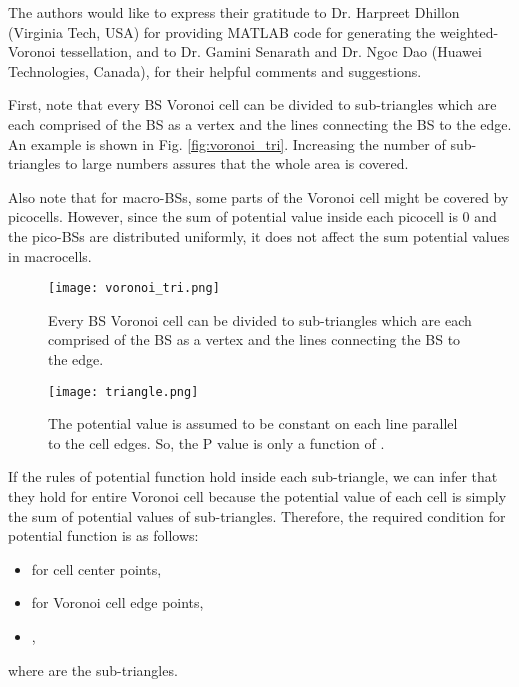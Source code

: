 \documentclass[journal]{IEEEtran}
\begin{document}
The authors would like to express their gratitude to Dr. Harpreet Dhillon (Virginia Tech, USA) for providing MATLAB code for generating the weighted-Voronoi tessellation, and to Dr. Gamini Senarath and Dr. Ngoc Dao (Huawei Technologies, Canada), for their helpful comments and suggestions.

\label{appendix1}

First, note that every BS Voronoi cell can be divided to sub-triangles which are each comprised of the BS as a vertex and the lines connecting the BS to the edge. An example is shown in Fig. \ref{fig:voronoi_tri}. Increasing the number of sub-triangles to large numbers assures that the whole area is covered.

Also note that for macro-BSs, some parts of the Voronoi cell might be covered by picocells. However, since the sum of potential value inside each picocell is 0 and the pico-BSs are distributed uniformly, it does not affect the sum potential values in macrocells.

\begin{figure}
\centering
\begin{minipage}{.45\textwidth}
  \centering
  \texttt{[image: voronoi\_tri.png]}
  \caption{Every BS Voronoi cell can be divided to sub-triangles which are each comprised of the BS as a vertex and the lines connecting the BS to the edge.}
  \label{fig:voronoi_tri}
\end{minipage}
\hspace{5 mm}
\begin{minipage}{.45\textwidth}
  \centering
  \texttt{[image: triangle.png]}
  \caption{The potential value is assumed to be constant on each line parallel to the cell edges. So, the P value is only a function of .}
  \label{fig:triangle}
\end{minipage}
\end{figure}

If the rules of potential function hold inside each sub-triangle, we can infer that they hold for entire Voronoi cell because the potential value of each cell is simply the sum of potential values of sub-triangles. Therefore, the required condition for potential function is as follows:
\begin{itemize}
\item  for cell center points, 
\item  for Voronoi cell edge points,
\item ,
\end{itemize}
where  are the sub-triangles.
\end{document}
